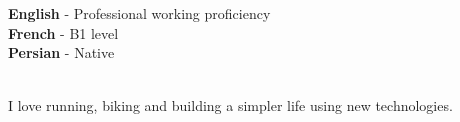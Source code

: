 \begin{minipage}[t]{0.45\textwidth}
    \vspace{-\baselineskip} %


    \textbf{English} - Professional working proficiency\\
    \textbf{French} - B1 level\\
    \textbf{Persian} - Native\\\
\end{minipage}
\hfill
\begin{minipage}[t]{0.45\textwidth}
    \vspace{-\baselineskip} %


    I love running, biking and building a simpler life using new technologies.
\end{minipage}

